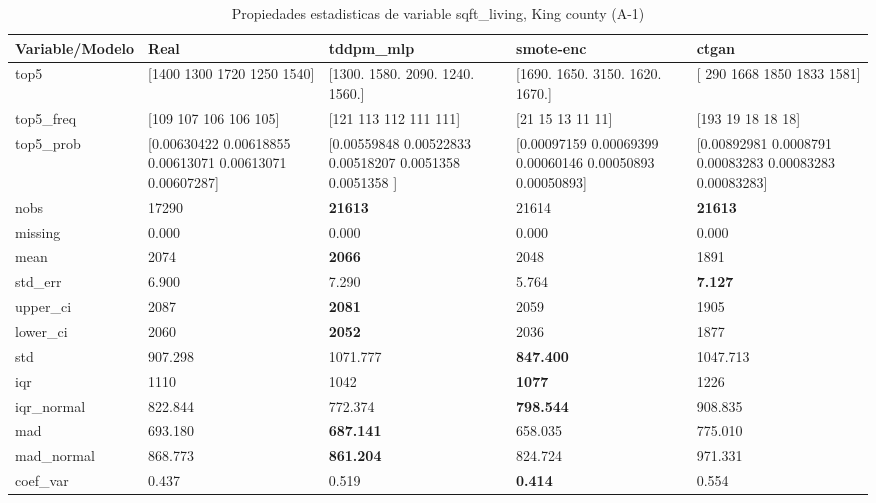 \begin{table}[H]
\centering
\fontsize{8}{14}\selectfont
\caption{Propiedades  estadisticas de variable sqft\_living, King county (A-1)}
\label{table-stats-king county-a-1-sqft_living}
\begin{tabular}{|l|m{10em}|m{10em}|m{10em}|m{10em}|}
\hline
 \rowcolor[gray]{0.8}
Variable/Modelo & Real & tddpm\_mlp & smote-enc & ctgan \\
\hline top5 & [1400 1300 1720 1250 1540] & [1300. 1580. 2090. 1240. 1560.] & [1690. 1650. 3150. 1620. 1670.] & [ 290 1668 1850 1833 1581] \\
\hline top5\_freq & [109 107 106 106 105] & [121 113 112 111 111] & [21 15 13 11 11] & [193  19  18  18  18] \\
\hline top5\_prob & [0.00630422 0.00618855 0.00613071 0.00613071 0.00607287] & [0.00559848 0.00522833 0.00518207 0.0051358  0.0051358 ] & [0.00097159 0.00069399 0.00060146 0.00050893 0.00050893] & [0.00892981 0.0008791  0.00083283 0.00083283 0.00083283] \\
\hline nobs & 17290 & \bfseries 21613 & \cellcolor[rgb]{0.9, 0.54, 0.52} 21614 & \bfseries 21613 \\
\hline missing & 0.000 & 0.000 & 0.000 & 0.000 \\
\hline mean & 2074 & \bfseries 2066 & 2048 & \cellcolor[rgb]{0.9, 0.54, 0.52} 1891 \\
\hline std\_err & 6.900 & 7.290 & \cellcolor[rgb]{0.9, 0.54, 0.52} 5.764 & \bfseries 7.127 \\
\hline upper\_ci & 2087 & \bfseries 2081 & 2059 & \cellcolor[rgb]{0.9, 0.54, 0.52} 1905 \\
\hline lower\_ci & 2060 & \bfseries 2052 & 2036 & \cellcolor[rgb]{0.9, 0.54, 0.52} 1877 \\
\hline std & 907.298 & \cellcolor[rgb]{0.9, 0.54, 0.52} 1071.777 & \bfseries 847.400 & 1047.713 \\
\hline iqr & 1110 & 1042 & \bfseries 1077 & \cellcolor[rgb]{0.9, 0.54, 0.52} 1226 \\
\hline iqr\_normal & 822.844 & 772.374 & \bfseries 798.544 & \cellcolor[rgb]{0.9, 0.54, 0.52} 908.835 \\
\hline mad & 693.180 & \bfseries 687.141 & 658.035 & \cellcolor[rgb]{0.9, 0.54, 0.52} 775.010 \\
\hline mad\_normal & 868.773 & \bfseries 861.204 & 824.724 & \cellcolor[rgb]{0.9, 0.54, 0.52} 971.331 \\
\hline coef\_var & 0.437 & 0.519 & \bfseries 0.414 & \cellcolor[rgb]{0.9, 0.54, 0.52} 0.554 \\

\end{tabular}
\end{table}

